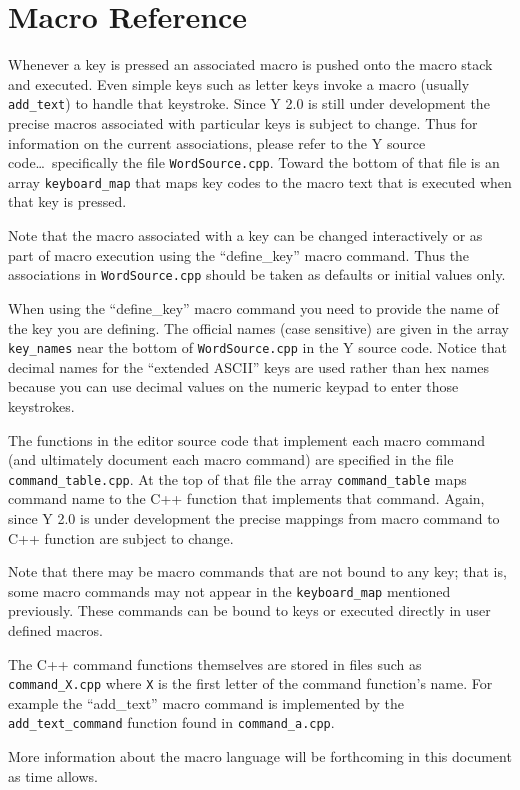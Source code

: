 \chapter{Macro Reference}

Whenever a key is pressed an associated macro is pushed onto the macro stack and executed. Even
simple keys such as letter keys invoke a macro (usually \texttt{add\_text}) to handle that
keystroke. Since Y 2.0 is still under development the precise macros associated with particular
keys is subject to change. Thus for information on the current associations, please refer to the
Y source code\ldots\ specifically the file \texttt{WordSource.cpp}. Toward the bottom of that
file is an array \texttt{keyboard\_map} that maps key codes to the macro text that is executed
when that key is pressed.

Note that the macro associated with a key can be changed interactively or as part of macro
execution using the ``define\_key'' macro command. Thus the associations in
\texttt{WordSource.cpp} should be taken as defaults or initial values only.

When using the ``define\_key'' macro command you need to provide the name of the key you are
defining. The official names (case sensitive) are given in the array \texttt{key\_names} near
the bottom of \texttt{WordSource.cpp} in the Y source code. Notice that decimal names for the
``extended ASCII'' keys are used rather than hex names because you can use decimal values on the
numeric keypad to enter those keystrokes.

The functions in the editor source code that implement each macro command (and ultimately
document each macro command) are specified in the file \texttt{command\_table.cpp}. At the top
of that file the array \texttt{command\_table} maps command name to the C++ function that
implements that command. Again, since Y 2.0 is under development the precise mappings from macro
command to C++ function are subject to change.

Note that there may be macro commands that are not bound to any key; that is, some macro
commands may not appear in the \texttt{keyboard\_map} mentioned previously. These commands can
be bound to keys or executed directly in user defined macros.

The C++ command functions themselves are stored in files such as \texttt{command\_X.cpp} where
\texttt{X} is the first letter of the command function's name. For example the ``add\_text''
macro command is implemented by the \texttt{add\_text\_command} function found in
\texttt{command\_a.cpp}.

More information about the macro language will be forthcoming in this document as time allows.
